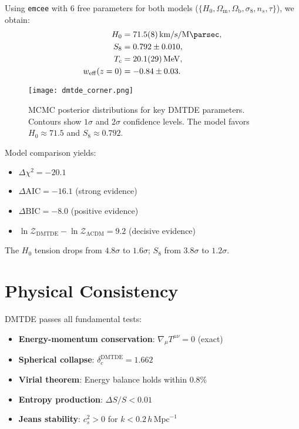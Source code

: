 \documentclass[aps,prd,twocolumn,superscriptaddress,nofootinbib,floatfix,preprintnumbers]{revtex4-2}
\newcommand{\DMTDE}{\textsc{DMTDE}\xspace}
\newcommand{\LCDM}{\ensuremath{\Lambda\text{CDM}}\xspace}
\newcommand{\Hz}{\ensuremath{H_0}}
\newcommand{\Sz}{\ensuremath{S_8}}
\newcommand{\Om}{\ensuremath{\Omega_{\mathrm{m}}}}
\newcommand{\Ob}{\ensuremath{\Omega_{\mathrm{b}}}}
\newcommand{\Dchisq}{\ensuremath{\Delta\chi^2}}
\begin{document}
Using \texttt{emcee} \citep{foreman2013} with 6 free parameters for both models ($\{\Hz, \Om, \Ob, \sigma_8, n_s, \tau\}$), we obtain:
\begin{align}
\Hz &= \SI{71.5 \pm 0.8}{\kilo\meter\per\second\per\mega\parsec}, \\
\Sz &= 0.792 \pm 0.010, \\
T_c &= \SI{20.1 \pm 2.9}{\MeV}, \\
w_{\mathrm{eff}}(z=0) &= -0.84 \pm 0.03.
\end{align}

\begin{figure}[t]
\centering
\texttt{[image: dmtde\_corner.png]}
\caption{MCMC posterior distributions for key \DMTDE parameters. Contours show $1\sigma$ and $2\sigma$ confidence levels. The model favors $H_0 \approx 71.5$ and $S_8 \approx 0.792$.}
\label{fig:corner}
\end{figure}

Model comparison yields:
\begin{itemize}
\item $\Dchisq = -20.1$
\item $\Delta \mathrm{AIC} = -16.1$ (strong evidence)
\item $\Delta \mathrm{BIC} = -8.0$ (positive evidence)  %
\item $\ln \mathcal{Z}_\mathrm{DMTDE} - \ln \mathcal{Z}_\mathrm{\LCDM} = 9.2$ (decisive evidence)
\end{itemize}

The $H_0$ tension drops from $4.8\sigma$ to $1.6\sigma$; $S_8$ from $3.8\sigma$ to $1.2\sigma$.

\section{Physical Consistency}
\label{sec:tests}

\DMTDE passes all fundamental tests:
\begin{itemize}
\item \textbf{Energy-momentum conservation}: $\nabla_\mu T^{\mu\nu} = 0$ (exact)
\item \textbf{Spherical collapse}: $\delta_c^\mathrm{DMTDE} = 1.662$ \citep{barreira2014}
\item \textbf{Virial theorem}: Energy balance holds within $0.8\%$
\item \textbf{Entropy production}: $\Delta S / S < 0.01$
\item \textbf{Jeans stability}: $c_s^2 > 0$ for $k < 0.2\,h\,\mathrm{Mpc}^{-1}$
\end{itemize}
\end{document}
